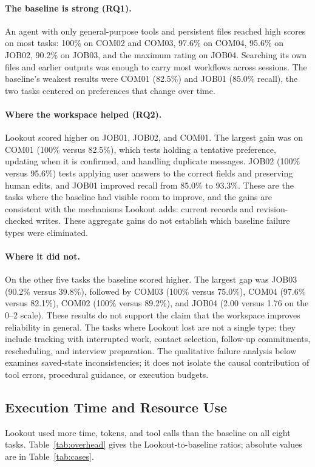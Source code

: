 \documentclass[twocolumn]{article}
\begin{document}
\paragraph{The baseline is strong (RQ1).}
An agent with only general-purpose tools and persistent files reached high scores on most tasks: 100\% on COM02 and COM03, 97.6\% on COM04, 95.6\% on JOB02, 90.2\% on JOB03, and the maximum rating on JOB04. Searching its own files and earlier outputs was enough to carry most workflows across sessions. The baseline's weakest results were COM01 (82.5\%) and JOB01 (85.0\% recall), the two tasks centered on preferences that change over time.

\paragraph{Where the workspace helped (RQ2).}
Lookout scored higher on JOB01, JOB02, and COM01. The largest gain was on COM01 (100\% versus 82.5\%), which tests holding a tentative preference, updating when it is confirmed, and handling duplicate messages. JOB02 (100\% versus 95.6\%) tests applying user answers to the correct fields and preserving human edits, and JOB01 improved recall from 85.0\% to 93.3\%. These are the tasks where the baseline had visible room to improve, and the gains are consistent with the mechanisms Lookout adds: current records and revision-checked writes. These aggregate gains do not establish which baseline failure types were eliminated.

\paragraph{Where it did not.}
On the other five tasks the baseline scored higher. The largest gap was JOB03 (90.2\% versus 39.8\%), followed by COM03 (100\% versus 75.0\%), COM04 (97.6\% versus 82.1\%), COM02 (100\% versus 89.2\%), and JOB04 (2.00 versus 1.76 on the 0--2 scale). These results do not support the claim that the workspace improves reliability in general. The tasks where Lookout lost are not a single type: they include tracking with interrupted work, contact selection, follow-up commitments, rescheduling, and interview preparation. The qualitative failure analysis below examines saved-state inconsistencies; it does not isolate the causal contribution of tool errors, procedural guidance, or execution budgets.

\subsection{Execution Time and Resource Use}
Lookout used more time, tokens, and tool calls than the baseline on all eight tasks. Table~\ref{tab:overhead} gives the Lookout-to-baseline ratios; absolute values are in Table~\ref{tab:cases}.
\end{document}
